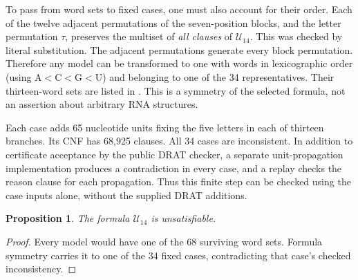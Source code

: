 \documentclass[11pt,a4paper]{article}
\newtheorem{proposition}[theorem]{Proposition}
\theoremstyle{definition}
\newcommand{\U}{\mathcal U_{14}}
\begin{document}
To pass from word sets to fixed cases, one must also account for their
order. Each of the twelve adjacent permutations of the seven-position
blocks, and the letter permutation $\tau$, preserves the multiset of
\emph{all clauses} of $\U$. This was checked by literal substitution.
The adjacent permutations generate every block permutation. Therefore
any model can be transformed to one with words in lexicographic order
(using $\mathrm A<\mathrm C<\mathrm G<\mathrm U$)
and belonging to one of the 34 representatives. Their thirteen-word
sets are listed in . This is a symmetry of
the selected formula, not an assertion about arbitrary RNA structures.

Each case adds 65 nucleotide units fixing the five letters in each of
thirteen branches. Its CNF has 68,925 clauses. All 34 cases are
inconsistent. In addition to certificate acceptance by the public
DRAT checker, a separate unit-propagation implementation produces a
contradiction in every case, and a replay checks the reason clause for
each propagation. Thus this finite step can be checked using the case
inputs alone, without the supplied DRAT additions.

\begin{proposition}\label{prop:u}
The formula $\U$ is unsatisfiable.
\end{proposition}
\begin{proof}
Every model would have one of the 68 surviving word sets. Formula
symmetry carries it to one of the 34 fixed cases, contradicting that
case's checked inconsistency.
\end{proof}
\end{document}
